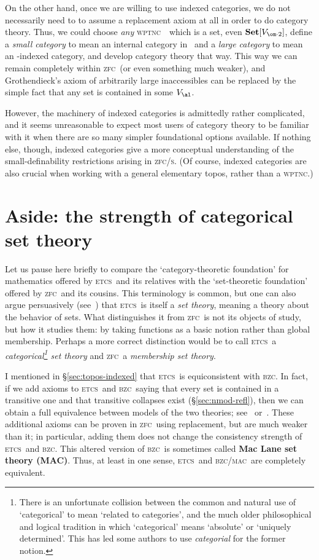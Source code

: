 \documentclass[12pt]{amsart}
\newcommand{\Set}{\ensuremath{\mathbf{Set}}}
\def\zfc{\textsc{zfc}}
\def\zfcs{\textsc{zfc/s}}
\def\wptnc{\textsc{wptnc}}
\def\etcs{\textsc{etcs}}
\def\bzc{\textsc{bzc}}
\def\mac{\textsc{mac}}
\begin{document}
On the other hand, once we are willing to use indexed categories, we
do not necessarily need to to assume a replacement axiom at all in
order to do category theory.  Thus, we could choose \emph{any} \wptnc\
\bS\ which is a set, even $\Set[V_{\om\cdot 2}]$, define a \emph{small
  category} to mean an internal category in \bS\ and a \emph{large
  category} to mean an \bS-indexed category, and develop category
theory that way.  This way we can remain completely within \zfc\ (or
even something much weaker), and Grothendieck's axiom of arbitrarily
large inaccessibles can be replaced by the simple fact that any set is
contained in some $V_\al$.

However, the machinery of indexed categories is admittedly rather
complicated, and it seems unreasonable to expect most users of
category theory to be familiar with it when there are so many simpler
foundational options available.  If nothing else, though, indexed
categories give a more conceptual understanding of the
small-definability restrictions arising in \zfcs.  (Of course, indexed
categories are also crucial when working with a general elementary
topos, rather than a \wptnc.)


\section{Aside: the strength of categorical set theory}
\label{sec:cst}

Let us pause here briefly to compare the `category-theoretic
foundation' for mathematics offered by \etcs\ and its relatives with
the `set-theoretic foundation' offered by \zfc\ and its cousins.  This
terminology is common, but one can also argue persuasively
(see~\cite{lawvere:etcs-long}) that \etcs\ is itself a \emph{set
  theory}, meaning a theory about the behavior of sets.  What
distinguishes it from \zfc\ is not its objects of study, but how it
studies them: by taking functions as a basic notion rather than global
membership.  Perhaps a more correct distinction would be to call
\etcs\ a \emph{categorical\footnote{There is an unfortunate collision
    between the common and natural use of `categorical' to mean
    `related to categories', and the much older philosophical and
    logical tradition in which `categorical' means `absolute' or
    `uniquely determined'.  This has led some authors to use
    \emph{categorial} for the former notion.} set theory} and \zfc\ a
\emph{membership set theory}.

I mentioned in \S\ref{sec:topos-indexed} that \etcs\ is equiconsistent
with \bzc.  In fact, if we add axioms to \etcs\ and \bzc\ saying that
every set is contained in a transitive one and that transitive
collapses exist (\S\ref{sec:nmod-refl}), then we can obtain a full
equivalence between models of the two theories;
see~\cite[Ch.~9]{ptj:topos-theory} or~\cite{osius:cat-setth}.  These
additional axioms can be proven in \zfc\ using replacement, but are
much weaker than it; in particular, adding them does not change the
consistency strength of \etcs\ and \bzc.  This altered version of
\bzc\ is sometimes called \textbf{Mac Lane set theory (MAC)}.  Thus,
at least in one sense, \etcs\ and \bzc/\mac\ are completely
equivalent.
\end{document}
